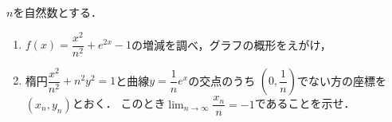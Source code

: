 \documentclass[../../main.tex]{subfiles}
\begin{document}
$n$を自然数とする．
\begin{enumerate}
  \item $\displaystyle f(x)=\dfrac{x^2}{n^2}+e^{2x}-1$の増減を調べ，グラフの概形をえがけ，
  \item 楕円$\displaystyle \dfrac{x^2}{n^2}+n^2 y^2=1$と曲線$\displaystyle y=\dfrac{1}{n}e^x$の交点のうち
    $\displaystyle \left( 0,\dfrac{1}{n} \right)$でない方の座標を$(x_n,y_n)$とおく．
    このとき$\displaystyle\lim_{n\to\infty}\dfrac{x_n}{n}=-1$であることを示せ．
\end{enumerate}
\end{document}
